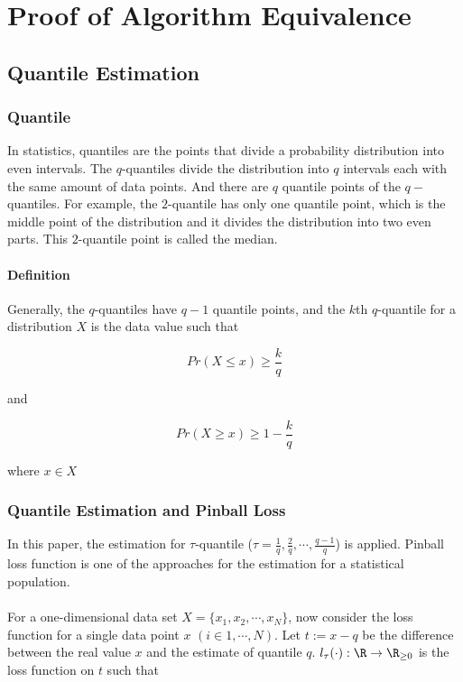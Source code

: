 \chapter{Proof of Algorithm Equivalence}
\label{ch: algo_equal}
            
\section{Quantile Estimation}

\subsection{Quantile}

In statistics, quantiles are the points that divide a probability distribution into even intervals.
The $q$-quantiles divide the distribution into $q$ intervals each with the same amount of data points.
And there are $q$ quantile points of the $q-$quantiles.
For example, the $2$-quantile has only one quantile point, which is the middle point of the distribution
and it divides the distribution into two even parts. This $2$-quantile point is called the median.


\subsubsection{Definition} \label{tau-quantile-def}
Generally, the $q$-quantiles have $q-1$ quantile points, and the $k$th $q$-quantile for a 
distribution $X$ is the data value such that

\begin{equation}
    Pr(X \leq x) \geq \frac{k}{q}
\end{equation}

and

\begin{equation}
    Pr(X \geq x) \geq 1 - \frac{k}{q}
\end{equation}

where $x \in X$

\subsection{Quantile Estimation and Pinball Loss}
In this paper, the estimation for $\tau$-quantile 
($\tau =  \frac{1}{q}, \frac{2}{q}, \cdots, \frac{q-1}{q}$)
is applied.
Pinball loss function is one of the approaches for the estimation for a statistical population.
\\\\
For a one-dimensional data set $X = \{x_1, x_2, \cdots, x_N\}$, 
now consider the loss function for a single data point $x$ $(i \in {1, \cdots, N})$.
Let $t := x - q$ be the difference between the real value $x$ and the estimate of quantile $q$.
$l_{\tau}(\cdot): \R \to \R_{\geq 0}$ is the loss function on $t$ such that

